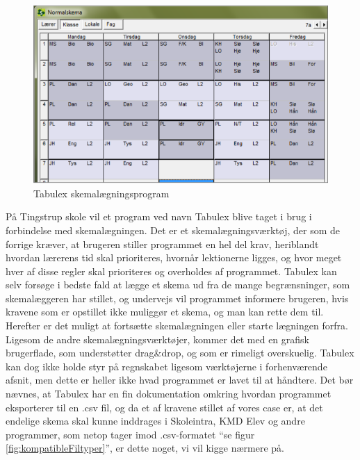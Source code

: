 \begin{figure}[h!]
	\centering
	\includegraphics[width=1.0\textwidth]{../Billeder/TabulexPicture.png}
	\caption{Tabulex skemalægningsprogram\cite{Tabulex}}
	\label{fig:TabulexPicture}
\end{figure}
\FloatBarrier
På Tingstrup skole vil et program ved navn Tabulex blive taget i brug i forbindelse med skemalægningen. Det er et skemalægningsværktøj, der som de forrige kræver, at brugeren stiller programmet en hel del krav, heriblandt hvordan lærerens tid skal prioriteres, hvornår lektionerne ligges, og hvor meget hver af disse regler skal prioriteres og overholdes af programmet\cite{Tabulex}. Tabulex kan selv forsøge i bedste fald at lægge et skema ud fra de mange begrænsninger, som skemalæggeren har stillet, og undervejs vil programmet informere brugeren, hvis kravene som er opstillet ikke muliggør et skema, og man kan rette dem til. Herefter er det  muligt at fortsætte skemalægningen eller starte lægningen forfra. Ligesom de andre skemalægningsværktøjer, kommer det med en grafisk brugerflade, som understøtter drag\&drop, og som er rimeligt overskuelig. Tabulex kan dog ikke holde styr på regnskabet ligesom værktøjerne i forhenværende afsnit, men dette er heller ikke hvad programmet er lavet til at håndtere. Det bør nævnes, at Tabulex har en fin dokumentation omkring hvordan programmet eksporterer til en .csv fil\cite{Tabulex_csv}, og da et af kravene stillet af vores case er, at det endelige skema skal kunne inddrages i Skoleintra, KMD Elev og andre programmer\cite{interview_Kaerby}, som netop tager imod .csv-formatet ``se figur \ref{fig:kompatibleFiltyper}'', er dette noget, vi vil kigge nærmere på.
